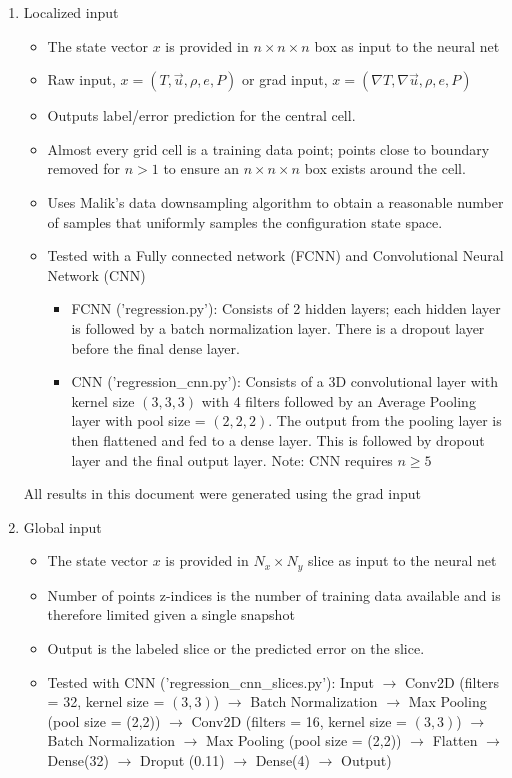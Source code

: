 \documentclass{article}
\begin{document}
\begin{enumerate}
    \item Localized input
    \begin{itemize}
        \item The state vector $x$ is provided in $n \times n \times n$ box as input to the neural net
        \item Raw input, $x = (T, \vec{u}, \rho, e, P)$ or grad input, $x = (\nabla T, \nabla \vec{u}, \rho, e, P)$
        \item Outputs label/error prediction for the central cell.
        \item Almost every grid cell is a training data point; points close to boundary removed for $n>1$ to ensure an $n \times n \times n$ box exists around the cell.
        \item Uses Malik's data downsampling algorithm to obtain a reasonable number of samples that uniformly samples the configuration state space.  
        \item Tested with a Fully connected network (FCNN) and Convolutional Neural Network (CNN) 
        \begin{itemize}
            \item FCNN ('regression.py'): Consists of 2 hidden layers; each hidden layer is followed by a batch normalization layer. There is a dropout layer before the final dense layer. 
            \item CNN ('regression\_cnn.py'): Consists of a 3D convolutional layer with kernel size $(3,3,3)$ with 4 filters followed by an Average Pooling layer with pool size = $(2,2,2)$. The output from the pooling layer is then flattened and fed to a dense layer. This is followed by dropout layer and the final output layer. Note: CNN requires $n \ge 5$
        \end{itemize}
    \end{itemize}
     All results in this document were generated using the grad input
    \item Global input
    \begin{itemize}
        \item The state vector $x$ is provided in $N_x \times N_y$ slice as input to the neural net
        \item Number of points z-indices is the number of training data available and is therefore limited given a single snapshot
        \item Output is the labeled slice or the predicted error on the slice.
        \item Tested with CNN ('regression\_cnn\_slices.py'): Input $\rightarrow$ Conv2D (filters = 32, kernel size = $(3,3)$) $\rightarrow$ Batch Normalization $\rightarrow$ Max Pooling (pool size = (2,2)) $\rightarrow$ Conv2D (filters = 16, kernel size = $(3,3)$) $\rightarrow$ Batch Normalization $\rightarrow$ Max Pooling (pool size = (2,2)) $\rightarrow$ Flatten $\rightarrow$ Dense(32) $\rightarrow$ Droput (0.11) $\rightarrow$ Dense(4) $\rightarrow$ Output)
    \end{itemize}
\end{enumerate}
\end{document}
